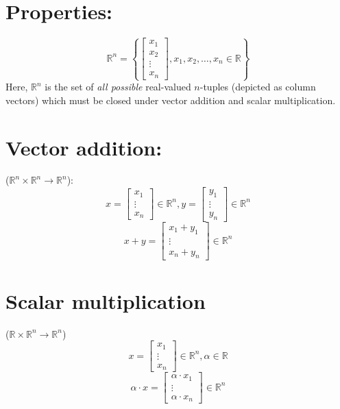 \section{\small Properties:}
\[
	\mathbb{R}^n =
	\left\{
	\begin{bmatrix}
		x_1    \\
		x_2    \\
		\vdots \\
		x_n
	\end{bmatrix},
	x_1, x_2, \dots, x_n \in \mathbb{R}
	\right\}
\]
Here, $\mathbb{R}^n$ is the set of \textit{all possible} real-valued $n$-tuples
(depicted as column vectors) which must be closed under vector addition and
scalar multiplication. \\

\section{\small Vector addition:}
 ($\mathbb{R}^n \times \mathbb{R}^n \rightarrow \mathbb{R}^n$):
\[
	x =
	\begin{bmatrix}
		x_1    \\
		\vdots \\
		x_n
	\end{bmatrix} \in \mathbb{R}^n,
	y =
	\begin{bmatrix}
		y_1    \\
		\vdots \\
		y_n
	\end{bmatrix} \in \mathbb{R}^n
\]
\[
	x + y =
	\begin{bmatrix}
		x_1 + y_1 \\
		\vdots    \\
		x_n + y_n
	\end{bmatrix} \in \mathbb{R}^n
\]

\section{\small Scalar multiplication}
 ($\mathbb{R} \times \mathbb{R}^n \rightarrow \mathbb{R}^n$)
\[
	x =
	\begin{bmatrix}
		x_1    \\
		\vdots \\
		x_n
	\end{bmatrix} \in \mathbb{R}^n,
	\alpha \in \mathbb{R}
\]
\[
	\alpha \cdot x =
	\begin{bmatrix}
		\alpha \cdot x_1 \\
		\vdots           \\
		\alpha \cdot x_n
	\end{bmatrix} \in \mathbb{R}^n
\]

